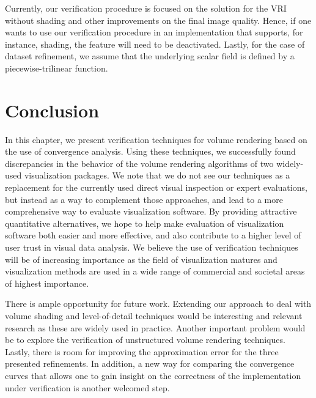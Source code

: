 Currently, our verification procedure is focused on the solution for
the VRI without shading and other improvements on the final image
quality. Hence, if one wants to use our verification procedure in an
implementation that supports, for instance, shading, the feature will
need to be deactivated. Lastly, for the case of dataset refinement, we
assume that the underlying scalar field is defined by a piecewise-trilinear
function.

\section{Conclusion}
\label{sec:conclusion}

In this chapter, we present verification techniques for volume rendering
based on the use of convergence analysis. Using these techniques, we
successfully found discrepancies in the behavior of the volume
rendering algorithms of two widely-used visualization packages.  We
note that we do not see our techniques as a replacement for the
currently used direct visual inspection or expert evaluations, but
instead as a way to complement those approaches, and lead to a more
comprehensive way to evaluate visualization software.  By providing
attractive quantitative alternatives, we hope to help make evaluation
of visualization software both easier and more effective, and also
contribute to a higher level of user trust in visual data analysis. We
believe the use of verification techniques will be of increasing
importance as the field of visualization matures and visualization
methods are used in a wide range of commercial and societal areas of
highest importance.

There is ample opportunity for future work. Extending our approach to
deal with volume shading and level-of-detail techniques would be
interesting and relevant research as these are widely used in
practice. Another important problem would be to explore the
verification of unstructured volume rendering techniques. Lastly,
there is room for improving the approximation error for
the three presented refinements. In addition, a new way for comparing
the convergence curves that allows one to gain insight on the
correctness of the implementation under verification is another
welcomed step.
